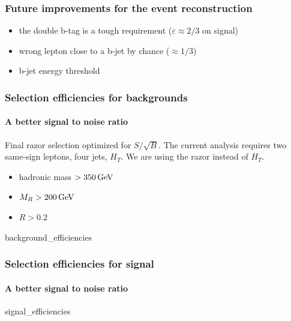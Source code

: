 \documentclass[ukenglish]{beamer}
\begin{document}
\begin{frame}
    \frametitle{Future improvements for the event reconstruction}
    \begin{itemize}
        \item the double b-tag is a tough requirement ($\varepsilon \approx 2/3$ on signal)
        \item wrong lepton close to a b-jet by chance ($\approx 1/3$)
        \item b-jet energy threshold
    \end{itemize}
\end{frame}

\begin{frame}
    \frametitle{Selection efficiencies for backgrounds}
    \framesubtitle{A better signal to noise ratio}
    Final razor selection optimized for $S/\sqrt{B}$. The current analysis
    requires two same-sign leptons, four jets, $H_T$. We are using the razor
    instead of $H_T$.
    \begin{itemize}
        \item hadronic mass $>\unit[350]{GeV}$
        \item $M_R > \unit[200]{GeV}$
        \item $R > 0.2$
    \end{itemize}
    {background_efficiencies}
\end{frame}

\begin{frame}
    \frametitle{Selection efficiencies for signal}
    \framesubtitle{A better signal to noise ratio}
    {signal_efficiencies}
\end{frame}
\end{document}
